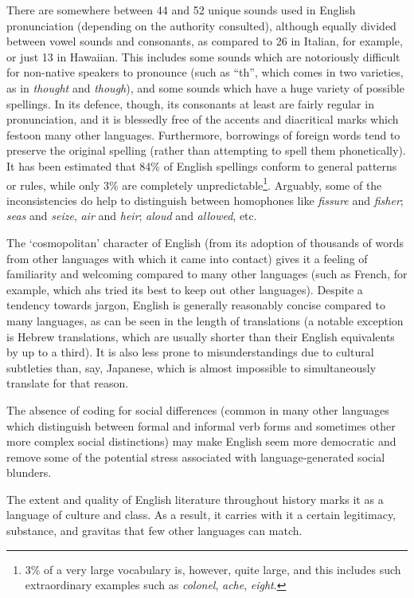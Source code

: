 \documentclass[../main.tex]{subfiles}
\begin{document}
        There are somewhere between 44 and 52 unique sounds used in English pronunciation (depending on the authority consulted), although equally divided between vowel sounds and consonants, as compared to 26 in Italian, for example, or just 13 in Hawaiian. This includes some sounds which are notoriously difficult for non-native speakers to pronounce (such as ``th'', which comes in two varieties, as in \textit{thought} and \textit{though}), and some sounds which have a huge variety of possible spellings. In its defence, though, its consonants at least are fairly regular in pronunciation, and it is blessedly free of the accents and diacritical marks which festoon many other languages. Furthermore, borrowings of foreign words tend to preserve the original spelling (rather than attempting to spell them phonetically). It has been estimated that 84\% of English spellings conform to general patterns or rules, while only 3\% are completely unpredictable\footnote{3\% of a very large vocabulary is, however, quite large, and this includes such extraordinary examples such as \textit{colonel}, \textit{ache}, \textit{eight}.}. Arguably, some of the inconsistencies do help to distinguish between homophones like \textit{fissure} and \textit{fisher}; \textit{seas} and \textit{seize}, \textit{air} and \textit{heir}; \textit{aloud} and \textit{allowed}, etc. \par
        The `cosmopolitan' character of English (from its adoption of thousands of words from other languages with which it came into contact) gives it a feeling of familiarity and welcoming compared to many other languages (such as French, for example, which ahs tried its best to keep out other languages). Despite a tendency towards jargon, English is generally reasonably concise compared to many languages, as can be seen in the length of translations (a notable exception is Hebrew translations, which are usually shorter than their English equivalents by up to a third). It is also less prone to misunderstandings due to cultural subtleties than, say, Japanese, which is almost impossible to simultaneously translate for that reason. \par
        The absence of coding for social differences (common in many other languages which distinguish between formal and informal verb forms and sometimes other more complex social distinctions) may make English seem more democratic and remove some of the potential stress associated with language-generated social blunders. \par 
        The extent and quality of English literature throughout history marks it as a language of culture and class. As a result, it carries with it a certain legitimacy, substance, and gravitas that few other languages can match.
\end{document}
